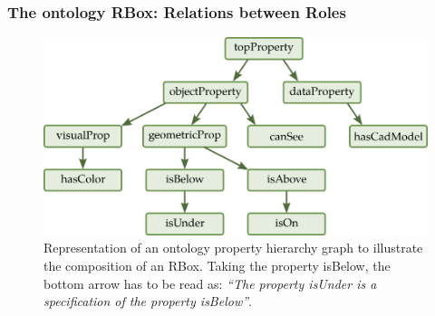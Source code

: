 \subsubsection{The ontology RBox: Relations between Roles}

\begin{figure}[ht!]
\centering
\includegraphics[scale=0.4]{figures/chapter2/Rbox.png}
\caption{\label{fig:Rbox} Representation of an ontology property hierarchy graph to illustrate the composition of an RBox. Taking the property isBelow, the bottom arrow has to be read as: \textit{``The property isUnder is a specification of the property isBelow''}.}
\end{figure}

